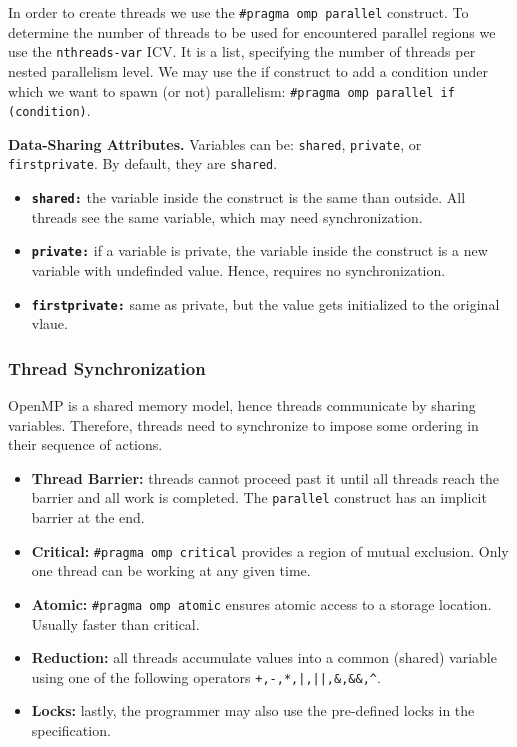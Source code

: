 In order to create threads we use the \texttt{\#pragma omp parallel} construct.
To determine the number of threads to be used for encountered parallel regions we use the \texttt{nthreads-var} ICV.
It is a list, specifying the number of threads per nested parallelism level.
We may use the if construct to add a condition under which we want to spawn (or not) parallelism: \texttt{\#pragma omp parallel if (condition)}.

\textbf{Data-Sharing Attributes.}
Variables can be: \texttt{shared}, \texttt{private}, or \texttt{firstprivate}.
By default, they are \texttt{shared}.
\begin{itemize}
    \item \textbf{\texttt{shared:}} the variable inside the construct is the same than outside. All threads see the same variable, which may need synchronization.
    \item \textbf{\texttt{private:}} if a variable is private, the variable inside the construct is a new variable with undefinded value. Hence, requires no synchronization.
    \item \textbf{\texttt{firstprivate:}} same as private, but the value gets initialized to the original vlaue.
\end{itemize}

\subsubsection{Thread Synchronization}

OpenMP is a shared memory model, hence threads communicate by sharing variables.
Therefore, threads need to synchronize to impose some ordering in their sequence of actions.
\begin{itemize}
    \item \textbf{Thread Barrier:} threads cannot proceed past it until all threads reach the barrier and all work is completed. The \texttt{parallel} construct has an implicit barrier at the end.
    \item \textbf{Critical:} \texttt{\#pragma omp critical} provides a region of mutual exclusion. Only one thread can be working at any given time.
    \item \textbf{Atomic:} \texttt{\#pragma omp atomic} ensures atomic access to a storage location. Usually faster than critical.
    \item \textbf{Reduction:} all threads accumulate values into a common (shared) variable using one of the following operators \texttt{+,-,*,|,||,\&,\&\&,\^}.
    \item \textbf{Locks:} lastly, the programmer may also use the pre-defined locks in the specification.
\end{itemize}

